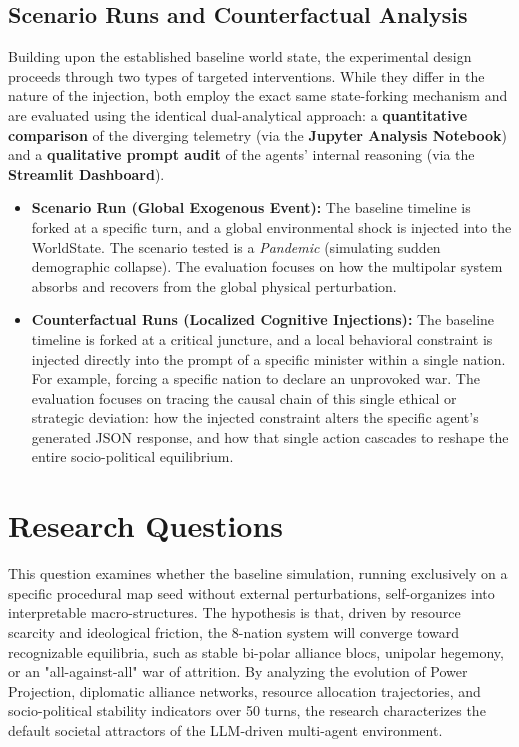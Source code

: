 \subsection*{Scenario Runs and Counterfactual Analysis}
Building upon the established baseline world state, the experimental design proceeds through two types of targeted interventions. While they differ in the nature of the injection, both employ the exact same state-forking mechanism and are evaluated using the identical dual-analytical approach: a \textbf{quantitative comparison} of the diverging telemetry (via the \textbf{Jupyter Analysis Notebook}) and a \textbf{qualitative prompt audit} of the agents' internal reasoning (via the \textbf{Streamlit Dashboard}).
\begin{itemize}
    \item \textbf{Scenario Run (Global Exogenous Event):} The baseline timeline is forked at a specific turn, and a global environmental shock is injected into the WorldState. The scenario tested is a \textit{Pandemic} (simulating sudden demographic collapse). The evaluation focuses on how the multipolar system absorbs and recovers from the global physical perturbation.
    \item \textbf{Counterfactual Runs (Localized Cognitive Injections):} The baseline timeline is forked at a critical juncture, and a local behavioral constraint is injected directly into the prompt of a specific minister within a single nation. For example, forcing a specific nation to declare an unprovoked war. The evaluation focuses on tracing the causal chain of this single ethical or strategic deviation: how the injected constraint alters the specific agent's generated JSON response, and how that single action cascades to reshape the entire socio-political equilibrium.
\end{itemize}

\section{Research Questions}


This question examines whether the baseline simulation, running exclusively on a specific procedural map seed without external perturbations, self-organizes into interpretable macro-structures. The hypothesis is that, driven by resource scarcity and ideological friction, the 8-nation system will converge toward recognizable equilibria, such as stable bi-polar alliance blocs, unipolar hegemony, or an "all-against-all" war of attrition. By analyzing the evolution of Power Projection, diplomatic alliance networks, resource allocation trajectories, and socio-political stability indicators over 50 turns, the research characterizes the default societal attractors of the LLM-driven multi-agent environment.
\\

